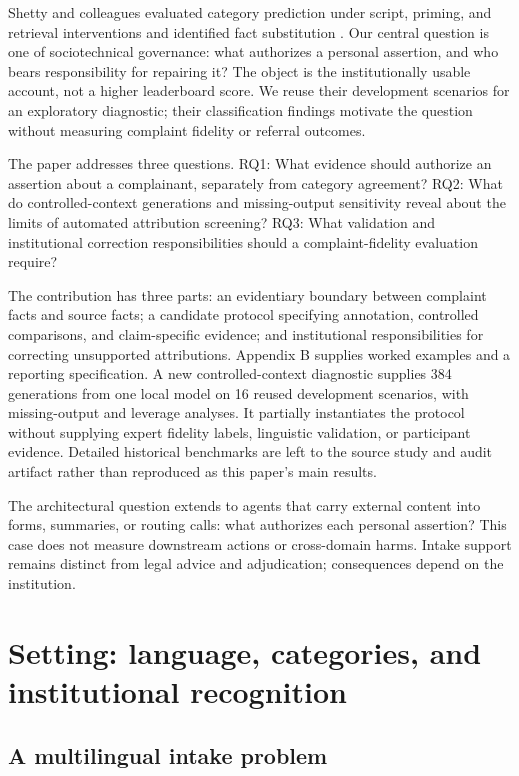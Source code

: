 \documentclass[manuscript,screen,review,anonymous]{acmart}
\begin{document}
Shetty and colleagues evaluated category prediction under script, priming, and retrieval interventions and identified fact substitution \cite{prior}. Our central question is one of sociotechnical governance: what authorizes a personal assertion, and who bears responsibility for repairing it? The object is the institutionally usable account, not a higher leaderboard score. We reuse their development scenarios for an exploratory diagnostic; their classification findings motivate the question without measuring complaint fidelity or referral outcomes.

The paper addresses three questions. RQ1: What evidence should authorize an assertion about a complainant, separately from category agreement? RQ2: What do controlled-context generations and missing-output sensitivity reveal about the limits of automated attribution screening? RQ3: What validation and institutional correction responsibilities should a complaint-fidelity evaluation require?

The contribution has three parts: an evidentiary boundary between complaint facts and source facts; a candidate protocol specifying annotation, controlled comparisons, and claim-specific evidence; and institutional responsibilities for correcting unsupported attributions. Appendix B supplies worked examples and a reporting specification. A new controlled-context diagnostic supplies 384 generations from one local model on 16 reused development scenarios, with missing-output and leverage analyses. It partially instantiates the protocol without supplying expert fidelity labels, linguistic validation, or participant evidence. Detailed historical benchmarks are left to the source study and audit artifact rather than reproduced as this paper's main results.

The architectural question extends to agents that carry external content into forms, summaries, or routing calls: what authorizes each personal assertion? This case does not measure downstream actions or cross-domain harms. Intake support remains distinct from legal advice and adjudication; consequences depend on the institution.

\section{Setting: language, categories, and institutional recognition}

\subsection{A multilingual intake problem}
\end{document}
